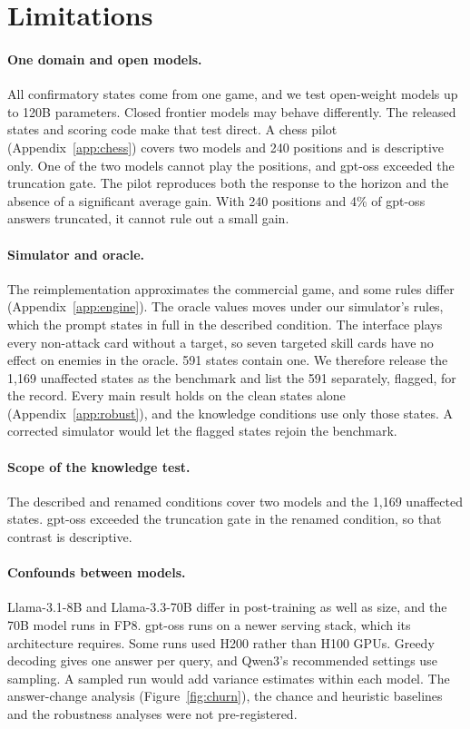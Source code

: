 \section*{Limitations}
\label{sec:limits}

\paragraph{One domain and open models.} All confirmatory states come from one game, and we test open-weight models up to 120B parameters. Closed frontier models may behave differently. The released states and scoring code make that test direct. A chess pilot (Appendix~\ref{app:chess}) covers two models and 240 positions and is descriptive only. One of the two models cannot play the positions, and gpt-oss exceeded the truncation gate. The pilot reproduces both the response to the horizon and the absence of a significant average gain. With 240 positions and 4\% of gpt-oss answers truncated, it cannot rule out a small gain.

\paragraph{Simulator and oracle.} The reimplementation approximates the commercial game, and some rules differ (Appendix~\ref{app:engine}). The oracle values moves under our simulator's rules, which the prompt states in full in the described condition. The interface plays every non-attack card without a target, so seven targeted skill cards have no effect on enemies in the oracle. 591 states contain one. We therefore release the 1,169 unaffected states as the benchmark and list the 591 separately, flagged, for the record. Every main result holds on the clean states alone (Appendix~\ref{app:robust}), and the knowledge conditions use only those states. A corrected simulator would let the flagged states rejoin the benchmark.

\paragraph{Scope of the knowledge test.} The described and renamed conditions cover two models and the 1,169 unaffected states. gpt-oss exceeded the truncation gate in the renamed condition, so that contrast is descriptive.

\paragraph{Confounds between models.} Llama-3.1-8B and Llama-3.3-70B differ in post-training as well as size, and the 70B model runs in FP8. gpt-oss runs on a newer serving stack, which its architecture requires. Some runs used H200 rather than H100 GPUs. Greedy decoding gives one answer per query, and Qwen3's recommended settings use sampling. A sampled run would add variance estimates within each model. The answer-change analysis (Figure~\ref{fig:churn}), the chance and heuristic baselines and the robustness analyses were not pre-registered.
